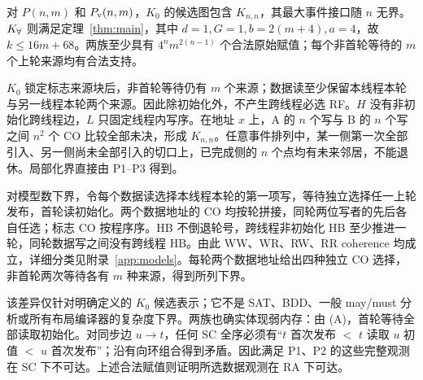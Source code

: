 \begin{cprop}[宽度差异与多种支持]\label{prop:separation}
对 $P(n,m)$ 和 $P_{\mathrm v}(n,m)$，$K_0$ 的候选图包含 $K_{n,n}$，其最大事件接口随 $n$ 无界。$K_{\forall}$ 则满足定理~\ref{thm:main}，其中 $d=1,G=1,b=2(m+4),a=4$，故 $k\le16m+68$。两族至少具有 $4^n m^{2(n-1)}$ 个合法原始赋值；每个非首轮等待的 $m$ 个上轮来源均有合法支持。
\end{cprop}
\begin{cproof}
$K_0$ 锁定标志来源块后，非首轮等待仍有 $m$ 个来源；数据读至少保留本线程本轮与另一线程本轮两个来源。因此除初始化外，不产生跨线程必选 RF。$H$ 没有非初始化跨线程边，$L$ 只固定线程内写序。在地址 $x$ 上，A 的 $n$ 个写与 B 的 $n$ 个写之间 $n^2$ 个 CO 比较全部未决，形成 $K_{n,n}$。任意事件排列中，某一侧第一次全部引入、另一侧尚未全部引入的切口上，已完成侧的 $n$ 个点均有未来邻居，不能退休。局部化界直接由 P1--P3 得到。

对模型数下界，令每个数据读选择本线程本轮的第一项写，等待独立选择任一上轮发布，首轮读初始化。两个数据地址的 CO 均按轮拼接，同轮两位写者的先后各自任选；标志 CO 按程序序。HB 不倒退轮号，跨线程非初始化 HB 至少推进一轮，同轮数据写之间没有跨线程 HB。由此 WW、WR、RW、RR coherence 均成立，详细分类见附录~\ref{app:models}。每轮两个数据地址给出四种独立 CO 选择，非首轮两次等待各有 $m$ 种来源，得到所列下界。
\end{cproof}

该差异仅针对明确定义的 $K_0$ 候选表示；它不是 SAT、BDD、一般 may/must 分析或所有布局编译器的复杂度下界。两族也确实体现弱内存：由 (A)，首轮等待全部读取初始化。对同步边 $u\to t$，任何 SC 全序必须有“$t$ 首次发布 $<$ $t$ 读取 $u$ 初值 $<$ $u$ 首次发布”；沿有向环组合得到矛盾。因此满足 P1、P2 的这些完整观测在 SC 下不可达。上述合法赋值则证明所选数据观测在 RA 下可达。
